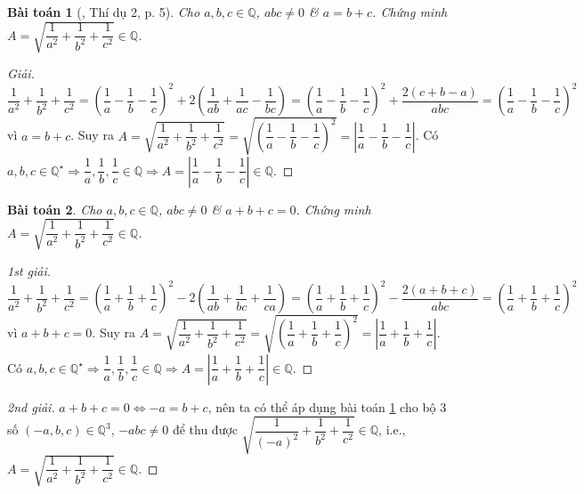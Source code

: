 \documentclass{article}
\newtheorem{baitoan}{Bài toán}
\begin{document}
\begin{baitoan}[\cite{Tuyen_Toan_9}, Thí dụ 2, p. 5]
	\label{prob: Tuyen_Toan_9 VD 2 p. 5}
	Cho $a,b,c\in\mathbb{Q}$, $abc\ne0$ \& $a = b + c$. Chứng minh $A = \sqrt{\dfrac{1}{a^2} + \dfrac{1}{b^2} + \dfrac{1}{c^2}}\in\mathbb{Q}$.
\end{baitoan}

\begin{proof}[Giải]
	$\dfrac{1}{a^2} + \dfrac{1}{b^2} + \dfrac{1}{c^2} = \left(\dfrac{1}{a} - \dfrac{1}{b} - \dfrac{1}{c}\right)^2 + 2\left(\dfrac{1}{ab} + \dfrac{1}{ac} - \dfrac{1}{bc}\right) = \left(\dfrac{1}{a} - \dfrac{1}{b} - \dfrac{1}{c}\right)^2 + \dfrac{2(c + b - a)}{abc} = \left(\dfrac{1}{a} - \dfrac{1}{b} - \dfrac{1}{c}\right)^2$ vì $a = b + c$. Suy ra $A = \sqrt{\dfrac{1}{a^2} + \dfrac{1}{b^2} + \dfrac{1}{c^2}} = \sqrt{\left(\dfrac{1}{a} - \dfrac{1}{b} - \dfrac{1}{c}\right)^2} = \left|\dfrac{1}{a} - \dfrac{1}{b} - \dfrac{1}{c}\right|$. Có $a,b,c\in\mathbb{Q}^\star\Rightarrow\dfrac{1}{a},\dfrac{1}{b},\dfrac{1}{c}\in\mathbb{Q}\Rightarrow A = \left|\dfrac{1}{a} - \dfrac{1}{b} - \dfrac{1}{c}\right|\in\mathbb{Q}$.
\end{proof}

\begin{baitoan}
	\label{prob: Mo rong Tuyen_Toan_9 VD 2 p. 5}
	Cho $a,b,c\in\mathbb{Q}$, $abc\ne0$ \& $a + b + c = 0$. Chứng minh $A = \sqrt{\dfrac{1}{a^2} + \dfrac{1}{b^2} + \dfrac{1}{c^2}}\in\mathbb{Q}$.
\end{baitoan}

\begin{proof}[1st giải]
	$\dfrac{1}{a^2} + \dfrac{1}{b^2} + \dfrac{1}{c^2} = \left(\dfrac{1}{a} + \dfrac{1}{b} + \dfrac{1}{c}\right)^2 - 2\left(\dfrac{1}{ab} + \dfrac{1}{bc} + \dfrac{1}{ca}\right) = \left(\dfrac{1}{a} + \dfrac{1}{b} + \dfrac{1}{c}\right)^2 - \dfrac{2(a + b + c)}{abc} = \left(\dfrac{1}{a} + \dfrac{1}{b} + \dfrac{1}{c}\right)^2$ vì $a + b + c = 0$. Suy ra $A = \sqrt{\dfrac{1}{a^2} + \dfrac{1}{b^2} + \dfrac{1}{c^2}} = \sqrt{\left(\dfrac{1}{a} + \dfrac{1}{b} + \dfrac{1}{c}\right)^2} = \left|\dfrac{1}{a} + \dfrac{1}{b} + \dfrac{1}{c}\right|$. Có $a,b,c\in\mathbb{Q}^\star\Rightarrow\dfrac{1}{a},\dfrac{1}{b},\dfrac{1}{c}\in\mathbb{Q}\Rightarrow A =\left|\dfrac{1}{a} + \dfrac{1}{b} + \dfrac{1}{c}\right|\in\mathbb{Q}$.
\end{proof}

\begin{proof}[2nd giải]
	$a + b + c = 0\Leftrightarrow -a = b + c$, nên ta có thể áp dụng bài toán \ref{prob: Tuyen_Toan_9 VD 2 p. 5} cho bộ 3 số $(-a,b,c)\in\mathbb{Q}^3$, $-abc\ne0$ để thu được $\sqrt{\dfrac{1}{(-a)^2} + \dfrac{1}{b^2} + \dfrac{1}{c^2}}\in\mathbb{Q}$, i.e., $A = \sqrt{\dfrac{1}{a^2} + \dfrac{1}{b^2} + \dfrac{1}{c^2}}\in\mathbb{Q}$.
\end{proof}
\end{document}
